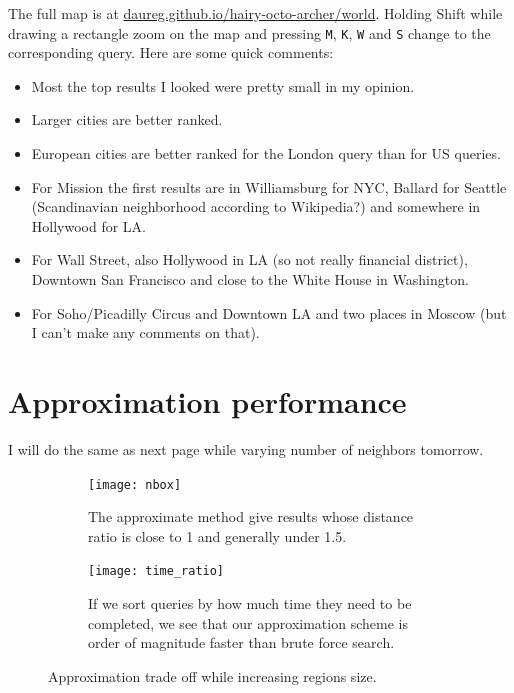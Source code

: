 \documentclass[svgnames,a4paper,final,notitlepage,10pt]{article}
\begin{document}
The full map is at \href{http://daureg.github.io/hairy-octo-archer/world/}%
{\url{daureg.github.io/hairy-octo-archer/world}}. Holding Shift while drawing a rectangle
zoom on the map and pressing \texttt{M}, \texttt{K}, \texttt{W} and \texttt{S} change to
the corresponding query.  Here are some quick comments:

\begin{itemize}
	\item Most the top results I looked were pretty small in my
		opinion.
	\item Larger cities are better ranked.
	\item European cities are better ranked for the London query than for
		US queries.
	\item For Mission the first results are in Williamsburg for NYC,
		Ballard for Seattle (Scandinavian neighborhood according to
		Wikipedia?) and somewhere in Hollywood for LA.
	\item For Wall Street, also Hollywood in LA (so not really financial
		district), Downtown San Francisco and close to the White House
		in Washington.
	\item For Soho/Picadilly Circus and Downtown LA and two places in
		Moscow (but I can't make any comments on that).
\end{itemize}
\clearpage

\section*{Approximation performance}
I will do the same as next page while varying number of neighbors tomorrow.

\begin{figure}[h]
    \begin{subfigure}[b]{\columnwidth}
        \centering
        \texttt{[image: nbox]}
	\caption[Approximation ratio]{The approximate method give results
		whose distance ratio is close to 1 and generally under 1.5.
	\label{fig:distance_ratio}}
    \end{subfigure}

    \begin{subfigure}[b]{\textwidth}
        \centering
        \texttt{[image: time\_ratio]}
	\caption[Time speed-up]{If we sort queries by how much time they need
	to be completed, we see that our approximation scheme is order of
magnitude faster than brute force search.\label{fig:time_5steps}}
    \end{subfigure}
    \caption{Approximation trade off while increasing regions size.\label{fig:approx_size}}
\end{figure}
\clearpage
\end{document}

